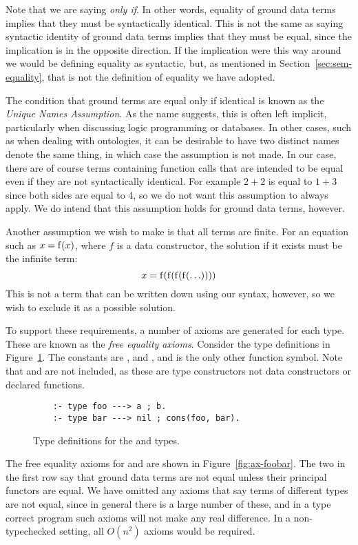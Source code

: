 Note that we are saying \emph{only if}.
In other words,
equality of ground data terms implies that
they must be syntactically identical.
This is not the same as saying
syntactic identity of ground data terms
implies that they must be equal,
since the implication is in the opposite direction.
If the implication were this way around
we would be defining equality as syntactic,
but, as mentioned in Section~\ref{sec:sem-equality},
that is not the definition of equality we have adopted.

The condition that ground terms are equal only if identical
is known as the \emph{Unique Names Assumption\label{gi:una}}.
As the name suggests, this is often left implicit,
particularly when discussing logic programming or databases.
In other cases, such as when dealing with ontologies,
it can be desirable to have two distinct names denote the same thing,
in which case the assumption is not made.
In our case,
there are of course terms containing function calls
that are intended to be equal even if they are not syntactically identical.
For example $2 + 2$ is equal to $1 + 3$
since both sides are equal to 4,
so we do not want this assumption to always apply.
We do intend that this assumption holds for ground data terms, however.

Another assumption we wish to make is that all terms are finite.
For an equation such as $x = \operatorname{f}(x)$,
where $f$ is a data constructor,
the solution if it exists must be the infinite term:
\[ x = \operatorname{f}(\operatorname{f}(\operatorname{f}(\operatorname{f}(\ldots)))) \]
This is not a term that can be written down using our syntax, however,
so we wish to exclude it as a possible solution.

To support these requirements,
a number of axioms are generated for each type.
These are known as the \emph{free equality axioms}.
Consider the type definitions in Figure~\ref{fig:decl-foobar}.
The constants are ,  and ,
and  is the only other function symbol.
Note that  and  are not included,
as these are type constructors not data constructors
or declared functions.

\begin{figure}
\begin{verbatim}
    :- type foo ---> a ; b.
    :- type bar ---> nil ; cons(foo, bar).
\end{verbatim}
\caption{Type definitions for the  and  types.
\label{fig:decl-foobar}}
\end{figure}

The free equality axioms for  and 
are shown in Figure~\ref{fig:ax-foobar}.
The two in the first row say that
ground data terms are not equal
unless their principal functors are equal.
We have omitted any axioms that say
terms of different types are not equal,
since in general there is a large number of these,
and in a type correct program
such axioms will not make any real difference.
In a non-typechecked setting,
all $O(n^2)$ axioms would be required.

